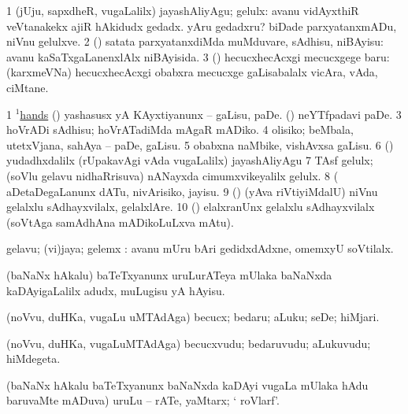 \noindent 
\gl{\akirx}
\expl{}
\bmng
\bnum
\num{1} (jUju, sapxdheR, \mo vugaLalilx) jayashAliyAgu; gelulx:  avanu vidAyxthiR veVtanakekx ajiR hAkidudx gedadx.  yAru gedadxru?  biDade parxyatanxmADu, niVnu gelulxve. 
\num{2} (\AmA) satata parxyatanxdiMda muMduvare, sAdhisu, niBAyisu:  avanu kaSaTxgaLanenxlAlx niBAyisida. 
\num{3} (\pArxparx) hecucxhecAcxgi mecucxgege baru:  (karxmeVNa) hecucxhecAcxgi obabxra mecucxge gaLisabalalx vicAra, vAda, ciMtane. 
\enum
\emng

\noindent 
\gl{\pagu}
\expl{}
\bmng
\bnum
\num{1}  \hyperref{kandict_h.pdf}{H}{hand(1) nuga(76)}{$^1$hands}  
  
\banum
{} (\AmA) yashasusx yA KAyxtiyanunx -- gaLisu, paDe. 
 (\ca) neYTfpadavi paDe. 
\eanum
\numie
\num{3}  hoVrADi sAdhisu; hoVrATadiMda mAgaR mADiko. 
\num{4}  olisiko; beMbala, utetxVjana, sahAya -- paDe, gaLisu. 
\num{5}  obabxna naMbike, vishAvxsa gaLisu. 
\num{6}  () \pArxparx\  yudadhxdalilx (rUpakavAgi vAda \mo vugaLalilx) jayashAliyAgu 
\num{7}  TAsf gelulx; (soVlu gelavu nidhaRrisuva) nANayxda cimumxvikeyalilx gelulx. 
\num{8}  (  aDetaDegaLanunx dATu, nivArisiko, jayisu. 
\num{9}  (\AmA) (yAva riVtiyiMdalU) niVnu gelalxlu sAdhayxvilalx, gelalxlAre. 
\num{10}  (\AmA) elalxranUnx gelalxlu sAdhayxvilalx (soVtAga samAdhAna mADikoLuLxva mAtu). 
\enum
\emng
\eentry

\bentry
{}
\gl{\nA}
\bmng
gelavu; (vi)jaya; gelemx :  avanu mUru bAri gedidxdAdxne, omemxyU soVtilalx. 
\emng
\eentry

\bentry
{} 
\gl{\sakirx}
\expl{}
\bmng
(baNaNx hAkalu) baTeTxyanunx uruLurATeya mUlaka baNaNxda kaDAyigaLalilx adudx, muLugisu yA hAyisu. 
\emng

\noindent 
\gl{\akirx}
\bmng
(noVvu, duHKa, \mo vugaLu uMTAdAga) becucx; bedaru; aLuku; seDe; hiMjari. 
\emng
\eentry

\bentry
{} 
\gl{\nA}
\bmng
(noVvu, duHKa, \mo vugaLuMTAdAga) becucxvudu; bedaruvudu; aLukuvudu; hiMdegeta. 
\emng
\eentry

\bentry
{} 
\gl{\nA}
\bmng
(baNaNx hAkalu baTeTxyanunx baNaNxda kaDAyi \mo vugaLa mUlaka hAdu baruvaMte mADuva) uruLu -- rATe, yaMtarx; ` roVlarf'. 
\emng
\eentry

